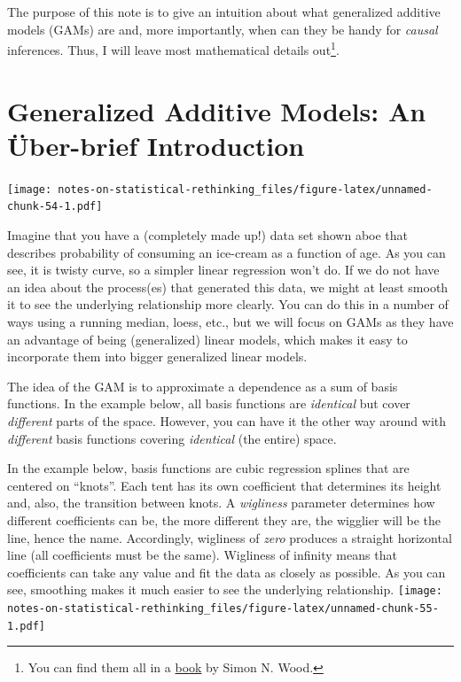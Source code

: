\documentclass[
]{book}
\begin{document}
The purpose of this note is to give an intuition about what generalized additive models (GAMs) are and, more importantly, when can they be handy for \emph{causal} inferences. Thus, I will leave most mathematical details out\footnote{You can find them all in a \href{https://www.routledge.com/Generalized-Additive-Models-An-Introduction-with-R-Second-Edition/Wood/p/book/9781498728331}{book} by Simon N. Wood.}.

\hypertarget{generalized-additive-models-an-uxfcber-brief-introduction}{%
\section{Generalized Additive Models: An Über-brief Introduction}\label{generalized-additive-models-an-uxfcber-brief-introduction}}

\texttt{[image: notes-on-statistical-rethinking\_files/figure-latex/unnamed-chunk-54-1.pdf]}

Imagine that you have a (completely made up!) data set shown aboe that describes probability of consuming an ice-cream as a function of age. As you can see, it is twisty curve, so a simpler linear regression won't do. If we do not have an idea about the process(es) that generated this data, we might at least smooth it to see the underlying relationship more clearly. You can do this in a number of ways using a running median, loess, etc., but we will focus on GAMs as they have an advantage of being (generalized) linear models, which makes it easy to incorporate them into bigger generalized linear models.

The idea of the GAM is to approximate a dependence as a sum of basis functions. In the example below, all basis functions are \emph{identical} but cover \emph{different} parts of the space. However, you can have it the other way around with \emph{different} basis functions covering \emph{identical} (the entire) space.

In the example below, basis functions are cubic regression splines that are centered on ``knots''. Each tent has its own coefficient that determines its height and, also, the transition between knots. A \emph{wigliness} parameter determines how different coefficients can be, the more different they are, the wigglier will be the line, hence the name. Accordingly, wigliness of \emph{zero} produces a straight horizontal line (all coefficients must be the same). Wigliness of infinity means that coefficients can take any value and fit the data as closely as possible. As you can see, smoothing makes it much easier to see the underlying relationship.
\texttt{[image: notes-on-statistical-rethinking\_files/figure-latex/unnamed-chunk-55-1.pdf]}
\end{document}
